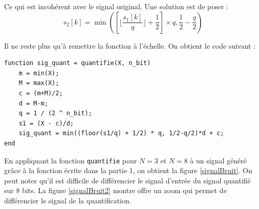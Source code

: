 \documentclass[french]{article}
\begin{document}
Ce qui est incohérent avec le signal original. Une solution est de poser :
\begin{equation}
  s_2[k] = \min\left(\left[\lfloor \frac{s_1[k]}{q} \rfloor + \frac{1}{2}\right] \times q, \frac{1}{2} - \frac{q}{2}\right)
\end{equation}

Il ne reste plus qu'à remettre la fonction à l'échelle. On obtient le code suivant :

\lstset{language=matlab}
\begin{lstlisting}
function sig_quant = quantifie(X, n_bit)
    m = min(X);
    M = max(X);
    c = (m+M)/2;
    d = M-m;
    q = 1 / (2 ^ n_bit);
    s1 = (X - c)/d;
    sig_quant = min((floor(s1/q) + 1/2) * q, 1/2-q/2)*d + c;
end
\end{lstlisting}
En appliquant la fonction \verb`quantifie` pour $N=3$ et $N=8$ à un signal généré grâce à la fonction écrite dans la partie 1, on obtient la figure \ref{signalBruit}. On peut noter qu'il est difficile de différencier le signal d'entrée du signal quantifié sur 8 bits. La figure \ref{signalBruit2} montre offre un zoom qui permet de différencier le signal de la quantification.
\end{document}
